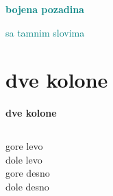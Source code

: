 \documentclass{beamer}
\begin{document}
\begin{frame}{\textcolor{teal}{\textbf{bojena pozadina}}}
	\begin{Huge}
		\textcolor{teal}{sa tamnim slovima}
	\end{Huge}
\end{frame}

\section{dve kolone}
\begin{frame}{\textbf{dve kolone}}
	\begin{columns}
		\column{5cm}
			gore levo \\
			dole levo \\
		\column{5cm}
			gore desno \\
			dole desno \\
	\end{columns}

\end{frame}
\end{document}
